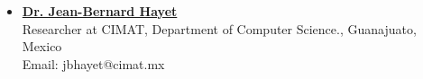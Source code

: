 \documentclass[10pt]{res}
\begin{document}
\begin{resume}
\begin{itemize}
\item   {\bf \href{http://aplicaciones.cimat.mx/Personal/jbhayet} {Dr. Jean-Bernard Hayet} }\\
Researcher at CIMAT, Department of Computer Science., Guanajuato, Mexico\\
Email: jbhayet@cimat.mx






\end{itemize}

\end{resume}
\end{document}
